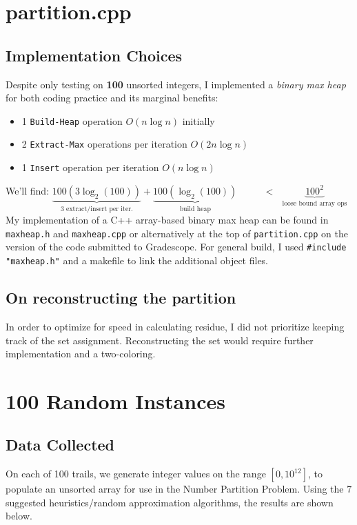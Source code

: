 \documentclass[conference]{styles/acmsiggraph}
\newcommand{\?}{\stackrel{?}{=}}
\begin{document}
\section{partition.cpp}
\subsection{Implementation Choices}
Despite only testing on \textbf{100} unsorted integers, I implemented a \textit{binary max heap} for both coding practice and its marginal benefits:
\begin{itemize}
    \item 1 \verb|Build-Heap| operation $O(n\log n)$ initially
    \item 2 \verb|Extract-Max| operations per iteration $O(2n\log n)$
    \item 1 \verb|Insert| operation per iteration $O(n\log n)$
\end{itemize}
We'll find: $\underbrace{100\left(3\log_{2}\left(100\right)\right)}_{\text{3 extract/insert per iter.}}+\underbrace{100\left(\log_{2}\left(100\right)\right)}_{\text{build heap}}\ \ \ \ \ \ \ \ \ \ \ \  \mathbf{<}\ \ \ \underbrace{100^2}_{\text{loose bound array ops}}$  \\

My implementation of a C++ array-based binary max heap can be found in \verb|maxheap.h| and \verb|maxheap.cpp| or alternatively at the top of \verb|partition.cpp| on the version of the code submitted to Gradescope.  For general build, I used \verb|#include "maxheap.h"| and a makefile to link the additional object files.

\subsection{On reconstructing the partition}
In order to optimize for speed in calculating residue, I did not prioritize keeping track of the set assignment.  Reconstructing the set would require further implementation and a two-coloring.




\newpage


\section{100 Random Instances}

\subsection{Data Collected} \label{section:data}
On each of 100 trails, we generate integer values on the range $[0, 10^{12}]$, to populate an unsorted array for use in the Number Partition Problem.  Using the 7 suggested heuristics/random approximation algorithms, the results are shown below.
\end{document}
